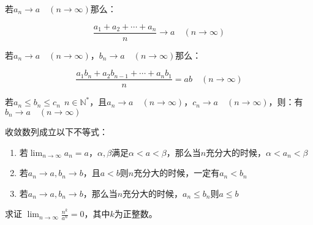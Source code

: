 
若\(a_n \rightarrow a\quad(n\rightarrow \infty)\)那么：

\[\frac{a_1+a_2+\cdots + a_n}{n} \rightarrow a\quad (n\rightarrow \infty)\]

若\(a_n \rightarrow a\quad(n\rightarrow \infty)\)，\(b _ n \rightarrow a\quad(n\rightarrow \infty)\)那么：

\[\frac{a_1 b _ n + a _ 2 b _ {n-1}+\cdots + a _ n b _ 1}{n} = ab\quad(n\rightarrow \infty)\]

\begin{theorem}[夹逼原理]
	若\(a_n\le b_n\le c_n~~n\in\mathbb N^*\)，且\(a_n \rightarrow a\quad(n\rightarrow \infty)\)，\(c_n \rightarrow a\quad(n\rightarrow \infty)\)，则：有\(b_n \rightarrow a\quad(n\rightarrow \infty)\)
\end{theorem}


\begin{theorem} 收敛数列成立以下不等式：

\begin{enumerate}
\def\labelenumi{\textnormal{\arabic{enumi}.}}
\item
  若\(\lim_{n\rightarrow \infty} a_n=a\)，\(\alpha,\beta\)满足\(\alpha<a<\beta\)，那么当\(n\)充分大的时候，\(\alpha<a_n<\beta\)
\item
  若\(a_n \rightarrow a, b_n\rightarrow b\)，且\(a<b\)则\(n\)充分大的时候，一定有\(a_n<b_n\)
\item
  若\(a_n \rightarrow a, b_n\rightarrow b\)，那么当\(n\)充分大的时候，\(a_n \le b _ n\)则\(a \le b\)
\end{enumerate}
\end{theorem}


\begin{example} 求证 $\displaystyle \lim_{n\rightarrow \infty} \frac{n^k}{a^n} = 0$，其中$k$为正整数。
\end{example}

